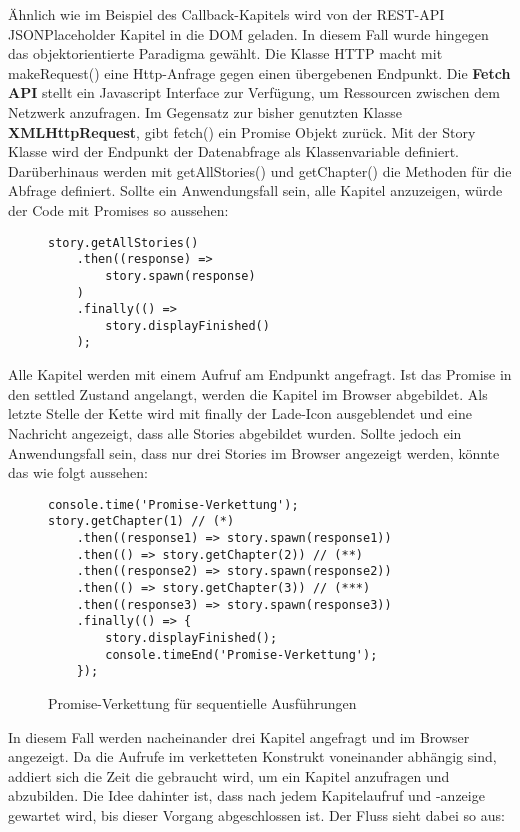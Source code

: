 \noindent
Ähnlich wie im Beispiel des Callback-Kapitels wird von der REST-API JSONPlaceholder Kapitel in die DOM geladen. In diesem Fall wurde hingegen das objektorientierte Paradigma gewählt. Die Klasse HTTP macht mit makeRequest() eine Http-Anfrage gegen einen übergebenen Endpunkt. Die \textbf{Fetch API} stellt ein Javascript Interface zur Verfügung, um Ressourcen zwischen dem Netzwerk anzufragen. Im Gegensatz zur bisher genutzten Klasse \textbf{XMLHttpRequest}, gibt fetch() ein Promise Objekt zurück. Mit der Story Klasse wird der Endpunkt der Datenabfrage als Klassenvariable definiert. Darüberhinaus werden mit getAllStories() und getChapter() die Methoden für die Abfrage definiert. Sollte ein Anwendungsfall sein, alle Kapitel anzuzeigen, würde der Code mit Promises so aussehen:

\begin{figure}[H]
\begin{lstlisting}[basicstyle=\small]
story.getAllStories()
    .then((response) =>
        story.spawn(response)
    )
    .finally(() =>
        story.displayFinished()
    );
\end{lstlisting}
\end{figure}

\noindent
Alle Kapitel werden mit einem Aufruf am Endpunkt angefragt. Ist das Promise in den settled Zustand angelangt, werden die Kapitel im Browser abgebildet. Als letzte Stelle der Kette wird mit finally der Lade-Icon ausgeblendet und eine Nachricht angezeigt, dass alle Stories abgebildet wurden. Sollte jedoch ein Anwendungsfall sein, dass nur drei Stories im Browser angezeigt werden, könnte das wie folgt aussehen: 

\begin{figure}[H]
\begin{lstlisting}[basicstyle=\small]
console.time('Promise-Verkettung');
story.getChapter(1) // (*)
    .then((response1) => story.spawn(response1))
    .then(() => story.getChapter(2)) // (**)
    .then((response2) => story.spawn(response2))
    .then(() => story.getChapter(3)) // (***)
    .then((response3) => story.spawn(response3))
    .finally(() => {
        story.displayFinished();
        console.timeEnd('Promise-Verkettung');
    });
\end{lstlisting}
\caption{Promise-Verkettung für sequentielle Ausführungen}
\label{Promises-sequential-calls}
\end{figure}

\noindent
In diesem Fall werden nacheinander drei Kapitel angefragt und im Browser angezeigt. Da die Aufrufe im verketteten Konstrukt voneinander abhängig sind, addiert sich die Zeit die gebraucht wird, um ein Kapitel anzufragen und abzubilden. Die Idee dahinter ist, dass nach jedem Kapitelaufruf und -anzeige gewartet wird, bis dieser Vorgang abgeschlossen ist. Der Fluss sieht dabei so aus:

